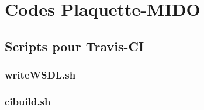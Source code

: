 \chapter*{Codes Plaquette-MIDO}

\makeatletter
\renewcommand{\thesection}{\@arabic\c@section}
\makeatother

\setcounter{section}{0}

\section{Scripts pour Travis-CI}

\subsection{writeWSDL.sh}
\label{sec:writeWSDL}


\vspace{1cm}

\subsection{cibuild.sh}
\label{sec:cibuild}
